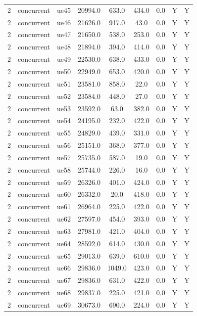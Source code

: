 \begin{table}[ht]
\begin{tabular}{|c|c|c|c|c|c|c|c|c|}
2 & concurrent & ue45 & 20994.0 & 633.0 & 434.0 & 0.0 & Y & Y \\
2 & concurrent & ue46 & 21626.0 & 917.0 & 43.0 & 0.0 & Y & Y \\
2 & concurrent & ue47 & 21650.0 & 538.0 & 253.0 & 0.0 & Y & Y \\
2 & concurrent & ue48 & 21894.0 & 394.0 & 414.0 & 0.0 & Y & Y \\
2 & concurrent & ue49 & 22530.0 & 638.0 & 433.0 & 0.0 & Y & Y \\
2 & concurrent & ue50 & 22949.0 & 653.0 & 420.0 & 0.0 & Y & Y \\
2 & concurrent & ue51 & 23581.0 & 858.0 & 22.0 & 0.0 & Y & Y \\
2 & concurrent & ue52 & 23584.0 & 448.0 & 27.0 & 0.0 & Y & Y \\
2 & concurrent & ue53 & 23592.0 & 63.0 & 382.0 & 0.0 & Y & Y \\
2 & concurrent & ue54 & 24195.0 & 232.0 & 422.0 & 0.0 & Y & Y \\
2 & concurrent & ue55 & 24829.0 & 439.0 & 331.0 & 0.0 & Y & Y \\
2 & concurrent & ue56 & 25151.0 & 368.0 & 377.0 & 0.0 & Y & Y \\
2 & concurrent & ue57 & 25735.0 & 587.0 & 19.0 & 0.0 & Y & Y \\
2 & concurrent & ue58 & 25744.0 & 226.0 & 16.0 & 0.0 & Y & Y \\
2 & concurrent & ue59 & 26326.0 & 401.0 & 424.0 & 0.0 & Y & Y \\
2 & concurrent & ue60 & 26332.0 & 20.0 & 418.0 & 0.0 & Y & Y \\
2 & concurrent & ue61 & 26964.0 & 225.0 & 422.0 & 0.0 & Y & Y \\
2 & concurrent & ue62 & 27597.0 & 454.0 & 393.0 & 0.0 & Y & Y \\
2 & concurrent & ue63 & 27981.0 & 421.0 & 404.0 & 0.0 & Y & Y \\
2 & concurrent & ue64 & 28592.0 & 614.0 & 430.0 & 0.0 & Y & Y \\
2 & concurrent & ue65 & 29013.0 & 639.0 & 610.0 & 0.0 & Y & Y \\
2 & concurrent & ue66 & 29836.0 & 1049.0 & 423.0 & 0.0 & Y & Y \\
2 & concurrent & ue67 & 29836.0 & 631.0 & 422.0 & 0.0 & Y & Y \\
2 & concurrent & ue68 & 29837.0 & 225.0 & 421.0 & 0.0 & Y & Y \\
2 & concurrent & ue69 & 30673.0 & 690.0 & 224.0 & 0.0 & Y & Y \\

\end{tabular}
\end{table}
